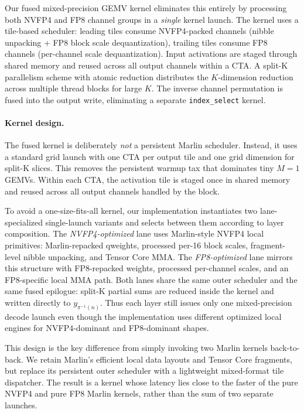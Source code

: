 \documentclass{article}
\begin{document}
Our fused mixed-precision GEMV kernel eliminates this entirely by processing both NVFP4 and FP8 channel groups in a \emph{single} kernel launch.
The kernel uses a tile-based scheduler: leading tiles consume NVFP4-packed channels (nibble unpacking + FP8 block scale dequantization), trailing tiles consume FP8 channels (per-channel scale dequantization).
Input activations are staged through shared memory and reused across all output channels within a CTA.
A split-K parallelism scheme with atomic reduction distributes the $K$-dimension reduction across multiple thread blocks for large $K$.
The inverse channel permutation is fused into the output write, eliminating a separate \texttt{index\_select} kernel.

\paragraph{Kernel design.}
The fused kernel is deliberately \emph{not} a persistent Marlin scheduler.
Instead, it uses a standard grid launch with one CTA per output tile and one grid dimension for split-K slices.
This removes the persistent warmup tax that dominates tiny $M=1$ GEMVs.
Within each CTA, the activation tile is staged once in shared memory and reused across all output channels handled by the block.

To avoid a one-size-fits-all kernel, our implementation instantiates two lane-specialized single-launch variants and selects between them according to layer composition.
The \emph{NVFP4-optimized} lane uses Marlin-style NVFP4 local primitives: Marlin-repacked qweights, processed per-16 block scales, fragment-level nibble unpacking, and Tensor Core MMA.
The \emph{FP8-optimized} lane mirrors this structure with FP8-repacked weights, processed per-channel scales, and an FP8-specific local MMA path.
Both lanes share the same outer scheduler and the same fused epilogue: split-K partial sums are reduced inside the kernel and written directly to $y_{\pi^{-1}(n)}$.
Thus each layer still issues only one mixed-precision decode launch even though the implementation uses different optimized local engines for NVFP4-dominant and FP8-dominant shapes.

This design is the key difference from simply invoking two Marlin kernels back-to-back.
We retain Marlin's efficient local data layouts and Tensor Core fragments, but replace its persistent outer scheduler with a lightweight mixed-format tile dispatcher.
The result is a kernel whose latency lies close to the faster of the pure NVFP4 and pure FP8 Marlin kernels, rather than the sum of two separate launches.
\end{document}
